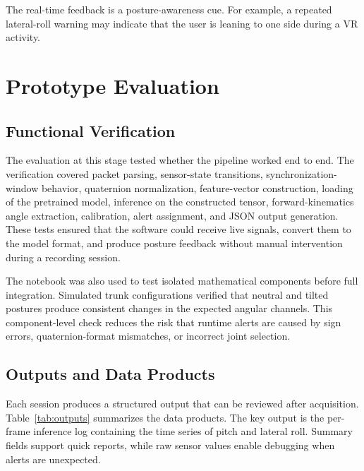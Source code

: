 \documentclass[conference]{IEEEtran}
\begin{document}
The real-time feedback is a posture-awareness cue. For example, a repeated lateral-roll
warning may indicate that the user is leaning to one side during a VR activity.

\section{Prototype Evaluation}
\subsection{Functional Verification}
The evaluation at this stage tested whether the pipeline worked end to end. The verification
covered packet parsing, sensor-state transitions, synchronization-window behavior,
quaternion normalization, feature-vector construction, loading of the pretrained model,
inference on the constructed tensor, forward-kinematics angle extraction, calibration, alert
assignment, and JSON output generation. These tests ensured that the software could receive
live signals, convert them to the model format, and produce posture feedback without manual
intervention during a recording session.

The notebook was also used to test isolated mathematical components before full integration.
Simulated trunk configurations verified that neutral and tilted postures produce consistent
changes in the expected angular channels. This component-level check reduces the risk that
runtime alerts are caused by sign errors, quaternion-format
mismatches, or incorrect joint selection.

\subsection{Outputs and Data Products}
Each session produces a structured output that can be reviewed after acquisition.
Table~\ref{tab:outputs} summarizes the data products. The key output is the per-frame
inference log containing the time series of pitch and lateral roll. Summary fields support
quick reports, while raw sensor values enable debugging when alerts are unexpected.
\end{document}

